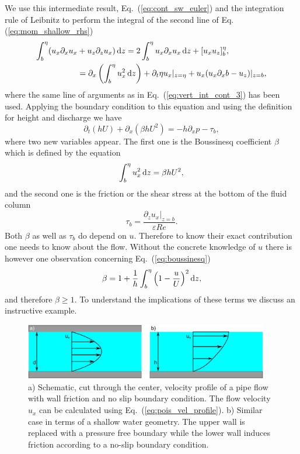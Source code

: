 We use this intermediate result, Eq.~(\ref{eq:cont_sw_euler}) and the integration rule of Leibnitz to perform the integral of the second line of Eq.(\ref{eq:mom_shallow_rhs}) 
\begin{align}
    \int_b^{\eta}(u_x\partial_x u_x &+ u_z\partial_{z} u_x )\mathop{}\!\mathrm{d} z = 2\int_b^{\eta} u_x\partial_x u_x \mathop{}\!\mathrm{d} z + [u_x u_z]_b^{\eta},\nonumber \\
     &= \partial_x\left(\int_b^{\eta}u_x^2 \mathop{}\!\mathrm{d} z\right) + \partial_t\eta u_x|_{z=\eta} + u_x(u_x\partial_x b - u_z)|_{z=b},
\end{align}
where the same line of arguments as in Eq.~(\ref{eq:vert_int_cont_3}) has been used.
Applying the boundary condition to this equation and using the definition for height and discharge we have
\begin{equation}\label{eq:sw_mom_final}
    \partial_t(hU) + \partial_x(\beta hU^2) = -h\partial_x p - \tau_b,
\end{equation}
where two new variables appear.
The first one is the Boussinesq coefficient $\beta$ which is defined by the equation
\begin{equation}\label{eq:boussinesq}
    \int_b^{\eta} u_x^2 \mathop{}\!\mathrm{d} z = \beta h U^2,
\end{equation}
and the second one is the friction or the shear stress at the bottom of the fluid column
\begin{equation}\label{eq:sw_bot_friction}
    \tau_b = \frac{\partial_z u_x|_{z=b}}{\varepsilon Re}. 
\end{equation}
Both $\beta$ as well as $\tau_b$ do depend on $u$. 
Therefore to know their exact contribution one needs to know about the flow.
Without the concrete knowledge of $u$ there is however one observation concerning Eq.~(\ref{eq:boussinesq})
\begin{equation}\label{eq:beta_lims}
    \beta = 1 + \frac{1}{h}\int_b^{\eta}\left(1 - \frac{u}{U}\right)^2 \mathop{}\!\mathrm{d} z,
\end{equation}
and therefore $\beta \geq 1$.
To understand the implications of these terms we discuss an instructive example.

\begin{figure}
    \centering
    \includegraphics[width=0.95\textwidth]{graphics/Simple_flow.pdf}
    \caption{a) Schematic, cut through the center, velocity profile of a pipe flow with wall friction and no slip boundary condition.
    The flow velocity $u_x$ can be calculated using Eq.~(\ref{eq:pois_vel_profile}).
    b) Similar case in terms of a shallow water geometry. 
    The upper wall is replaced with a pressure free boundary while the lower wall induces friction according to a no-slip boundary condition.
    }
    \label{fig:pois_vel_profile}
\end{figure}
